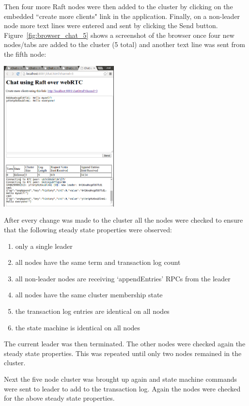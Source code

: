 \documentclass[9pt]{extarticle}
\begin{document}
\begin{multicols}{2}
Then four more Raft nodes were then added to the cluster by clicking
on the embedded ``create more clients" link in the application.
Finally, on a non-leader node more text lines were entered and sent by
clicking the Send button. Figure~\ref{fig:browser_chat_5} shows
a screenshot of the browser once four new nodes/tabs are added to the
cluster (5 total) and another text line was sent from the fifth node:

\begin{center}
    \includegraphics[width=0.45\textwidth]{imgs/chat_5a.png}
    \label{fig:browser_chat_5}
\end{center}

After every change was made to the cluster all the nodes were checked
to ensure that the following steady state properties were observed:
\begin{enumerate}
\item only a single leader
\item all nodes have the same term and transaction log count
\item all non-leader nodes are receiving `appendEntries' RPCs from the leader
\item all nodes have the same cluster membership state
\item the transaction log entries are identical on all nodes
\item the state machine is identical on all nodes
\end{enumerate}

The current leader was then terminated. The other nodes were checked
again the steady state properties. This was repeated until only two
nodes remained in the cluster.

Next the five node cluster was brought up again and state machine
commands were sent to leader to add to the transaction log. Again the
nodes were checked for the above steady state properties.


\end{multicols}
\end{document}
